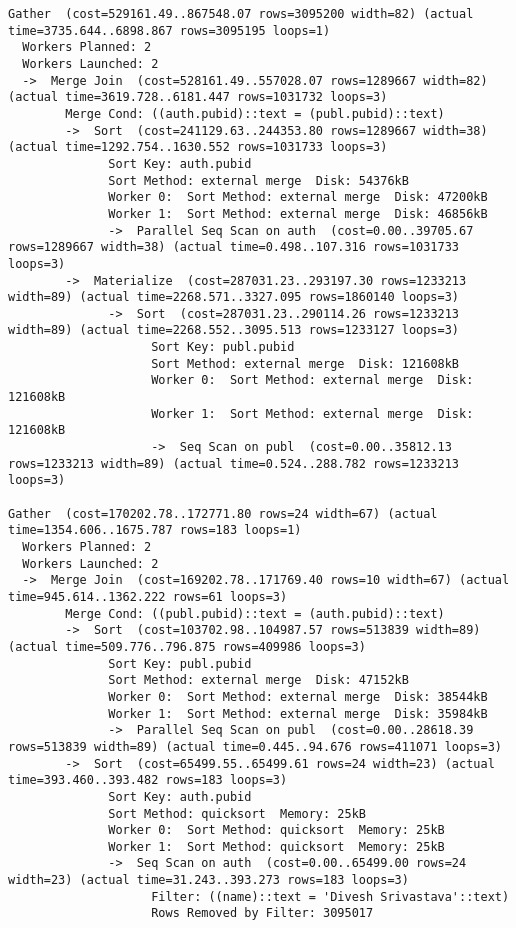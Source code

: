 \documentclass[11pt]{scrartcl}
\begin{document}
{\small
\parskip0pt\begin{verbatim}
Gather  (cost=529161.49..867548.07 rows=3095200 width=82) (actual time=3735.644..6898.867 rows=3095195 loops=1)
  Workers Planned: 2
  Workers Launched: 2
  ->  Merge Join  (cost=528161.49..557028.07 rows=1289667 width=82) (actual time=3619.728..6181.447 rows=1031732 loops=3)
        Merge Cond: ((auth.pubid)::text = (publ.pubid)::text)
        ->  Sort  (cost=241129.63..244353.80 rows=1289667 width=38) (actual time=1292.754..1630.552 rows=1031733 loops=3)
              Sort Key: auth.pubid
              Sort Method: external merge  Disk: 54376kB
              Worker 0:  Sort Method: external merge  Disk: 47200kB
              Worker 1:  Sort Method: external merge  Disk: 46856kB
              ->  Parallel Seq Scan on auth  (cost=0.00..39705.67 rows=1289667 width=38) (actual time=0.498..107.316 rows=1031733 loops=3)
        ->  Materialize  (cost=287031.23..293197.30 rows=1233213 width=89) (actual time=2268.571..3327.095 rows=1860140 loops=3)
              ->  Sort  (cost=287031.23..290114.26 rows=1233213 width=89) (actual time=2268.552..3095.513 rows=1233127 loops=3)
                    Sort Key: publ.pubid
                    Sort Method: external merge  Disk: 121608kB
                    Worker 0:  Sort Method: external merge  Disk: 121608kB
                    Worker 1:  Sort Method: external merge  Disk: 121608kB
                    ->  Seq Scan on publ  (cost=0.00..35812.13 rows=1233213 width=89) (actual time=0.524..288.782 rows=1233213 loops=3)

Gather  (cost=170202.78..172771.80 rows=24 width=67) (actual time=1354.606..1675.787 rows=183 loops=1)
  Workers Planned: 2
  Workers Launched: 2
  ->  Merge Join  (cost=169202.78..171769.40 rows=10 width=67) (actual time=945.614..1362.222 rows=61 loops=3)
        Merge Cond: ((publ.pubid)::text = (auth.pubid)::text)
        ->  Sort  (cost=103702.98..104987.57 rows=513839 width=89) (actual time=509.776..796.875 rows=409986 loops=3)
              Sort Key: publ.pubid
              Sort Method: external merge  Disk: 47152kB
              Worker 0:  Sort Method: external merge  Disk: 38544kB
              Worker 1:  Sort Method: external merge  Disk: 35984kB
              ->  Parallel Seq Scan on publ  (cost=0.00..28618.39 rows=513839 width=89) (actual time=0.445..94.676 rows=411071 loops=3)
        ->  Sort  (cost=65499.55..65499.61 rows=24 width=23) (actual time=393.460..393.482 rows=183 loops=3)
              Sort Key: auth.pubid
              Sort Method: quicksort  Memory: 25kB
              Worker 0:  Sort Method: quicksort  Memory: 25kB
              Worker 1:  Sort Method: quicksort  Memory: 25kB
              ->  Seq Scan on auth  (cost=0.00..65499.00 rows=24 width=23) (actual time=31.243..393.273 rows=183 loops=3)
                    Filter: ((name)::text = 'Divesh Srivastava'::text)
                    Rows Removed by Filter: 3095017
\end{verbatim}}
\end{document}
